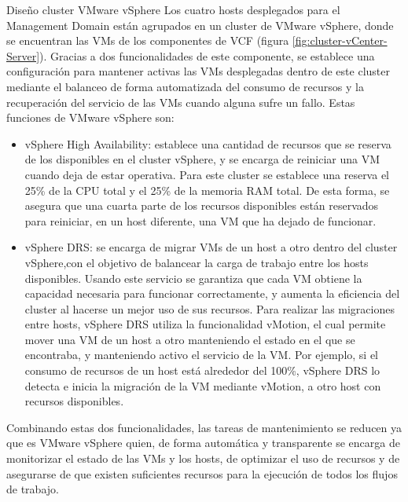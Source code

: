 \begin{subsubsection}{Diseño cluster VMware vSphere}
\label{subsubsec:diseno-vsphere}
Los cuatro hosts desplegados para el Management Domain están agrupados en un cluster de VMware vSphere, donde se encuentran las VMs de los componentes de VCF (figura \ref{fig:cluster-vCenter-Server}). Gracias a dos funcionalidades de este componente, se establece una configuración para mantener activas las VMs desplegadas dentro de este cluster mediante el balanceo de forma automatizada del consumo de recursos y la recuperación del servicio de las VMs cuando alguna sufre un fallo. Estas funciones de VMware vSphere son:
\begin{itemize}
  \item vSphere High Availability: establece una cantidad de recursos que se reserva de los disponibles en el cluster vSphere, y se encarga de reiniciar una VM cuando deja de estar operativa. Para este cluster se establece una reserva el 25\% de la CPU total y el 25\% de la memoria RAM total. De esta forma, se asegura que una cuarta parte de los recursos disponibles están reservados para reiniciar, en un host diferente, una VM que ha dejado de funcionar.
  
  \item vSphere DRS: se encarga de migrar VMs de un host a otro dentro del cluster vSphere,con el objetivo de balancear la carga de trabajo entre los hosts disponibles. Usando este servicio se garantiza que cada VM obtiene la capacidad necesaria para funcionar correctamente, y aumenta la eficiencia del cluster al hacerse un mejor uso de sus recursos. Para realizar las migraciones entre hosts, vSphere DRS utiliza la funcionalidad vMotion, el cual permite mover una VM de un host a otro manteniendo el estado en el que se encontraba, y manteniendo activo el servicio de la VM. Por ejemplo, si el consumo de recursos de un host está alrededor del 100\%, vSphere DRS lo detecta e inicia la migración de la VM mediante vMotion, a otro host con recursos disponibles. 
\end{itemize}

Combinando estas dos funcionalidades, las tareas de mantenimiento se reducen ya que es VMware vSphere quien, de forma automática y transparente se encarga de monitorizar el estado de las VMs y los hosts, de optimizar el uso de recursos y de asegurarse de que existen suficientes recursos para la ejecución de todos los flujos de trabajo.


\end{subsubsection}
